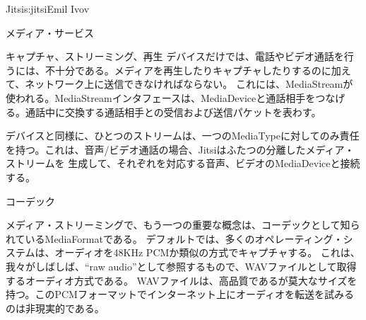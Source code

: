 \begin{aosachapter}{Jitsi}{s:jitsi}{Emil Ivov}
\begin{aosasect1}{メディア・サービス}
\begin{aosasect2}{キャプチャ、ストリーミング、再生}
デバイスだけでは、電話やビデオ通話を行うには、不十分である。メディアを再生したりキャプチャしたりするのに加えて、ネットワーク上に送信できなければならない。
これには、MediaStreamが使われる。MediaStreamインタフェースは、MediaDeviceと通話相手をつなげる。通話中に交換する通話相手との受信および送信パケットを表わす。

デバイスと同様に、ひとつのストリームは、一つのMediaTypeに対してのみ責任を持つ。これは、音声/ビデオ通話の場合、Jitsiはふたつの分離したメディア・ストリームを
生成して、それぞれを対応する音声、ビデオのMediaDeviceと接続する。


\end{aosasect2}

\begin{aosasect2}{コーデック}

メディア・ストリーミングで、もう一つの重要な概念は、コーデックとして知られているMediaFormatである。
デフォルトでは、多くのオペレーティング・システムは、オーディオを48KHz PCMか類似の方式でキャプチャする。
これは、我々がしばしば、``raw audio''として参照するもので、WAVファイルとして取得するオーディオ方式である。
WAVファイルは、高品質であるが莫大なサイズを持つ。このPCMフォーマットでインターネット上にオーディオを転送を試みるのは非現実的である。


\end{aosasect2}
\end{aosasect1}
\end{aosachapter}
